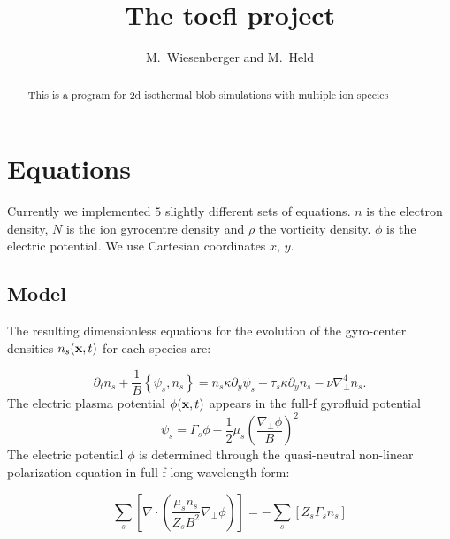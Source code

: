 


\usepackage{minted}



\title{The toefl project}
\author{ M.~Wiesenberger and M.~Held}
\maketitle

\begin{abstract}
  This is a program for 2d isothermal blob simulations with multiple ion species
\end{abstract}

\section{Equations}
Currently we implemented $5$ slightly different sets of equations. $n$ is the electron density, $N$ is the ion gyrocentre density and $\rho$
the vorticity density. $\phi$ is the electric potential. We
use Cartesian coordinates $x$, $y$.
\subsection{Model}

The resulting dimensionless equations for the evolution of the gyro-center
densities $n_s({\bf x},t)$ for each species are:

\begin{equation}
    \partial_t n_s   + \frac{1}{B} \left \{ \psi_s, n_s \right \}
  =  n_s \kappa \partial_y \psi_s
  + \tau_s \kappa \partial_y n_s
  -\nu \nabla_{\perp}^4 n_s. \label{eq:density}
\end{equation}
The electric plasma potential $\phi({\bf x},t)$ appears in the full-f
gyrofluid potential
\begin{equation}
    \psi_s  =  \Gamma_s \phi - \frac{1}{2} \mu_s \left(
    \frac{\nabla_{\perp} \phi}{B} \right)^{2}
\end{equation}
The electric potential $\phi$ is determined through the quasi-neutral non-linear
polarization equation in full-f long wavelength form:

\begin{equation}
  \sum_s \left[  \nabla \cdot \left( \frac{\mu_s n_s}{Z_s B^2}
    \nabla_{\perp} \phi \right)  \right] =  - \sum_s \left[ Z_s \Gamma_s n_s  \right]
  \label{eq:polarization}
\end{equation}

